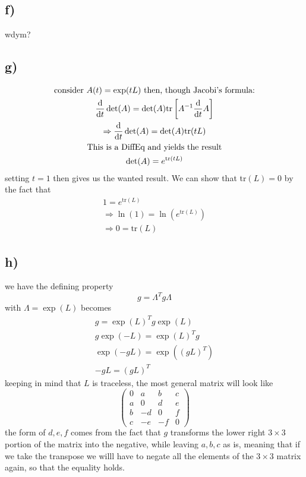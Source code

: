 \documentclass[]{scrartcl}
\begin{document}
\subsection{f)}

wdym?

\subsection{g)}

\begin{gather}
	\text{consider } A(t) = \exp(tL)\text{ then, though Jacobi's formula:}\\
	\frac{\text d}{\text dt}\det(A) = \det(A) \text{tr}\left[A^{-1} \frac{\text d}{\text dt}A\right]\\
\Rightarrow \frac{\text d}{\text dt}\det(A) = \det(A)\text{tr}(tL)\\
\text{This is a DiffEq and yields the result}\\
\det(A) = e^{\text{tr}(tL)}
\end{gather}
setting $t=1$ then gives us the wanted result. We can show that tr$(L) = 0$ by the fact that
\begin{gather}
	1 = e^{\text{tr}(L)}\\
	\Rightarrow \ln(1) = \ln\left(e^{\text{tr}(L)}\right)\\
	\Rightarrow 0 = \text{tr}(L)
\end{gather}


\subsection{h)}

we have the defining property
\begin{equation}
	g = \Lambda^T g \Lambda
\end{equation}
with $\Lambda = \exp(L)$ becomes
\begin{gather}
	g = \exp(L)^T g \exp(L)\\
	g\exp(-L) = \exp(L)^T g\\
	\exp(-gL) = \exp((gL)^T)\\
	-gL = (gL)^T
\end{gather}
keeping in mind that $L$ is traceless, the most general matrix will look like
$$
\begin{pmatrix}
	0 & a & b & c\\
	a & 0 & d & e\\
	b & -d & 0 & f\\
	c & -e & -f & 0
\end{pmatrix}
$$
the form of $d,e,f$ comes from the fact that $g$ transforms the lower right $3\times3$ portion of the matrix into the negative, while leaving $a,b,c$ as is, meaning that if we take the transpose we willl have to negate all the elements of the $3\times3$ matrix again, so that the equality holds.
\end{document}
